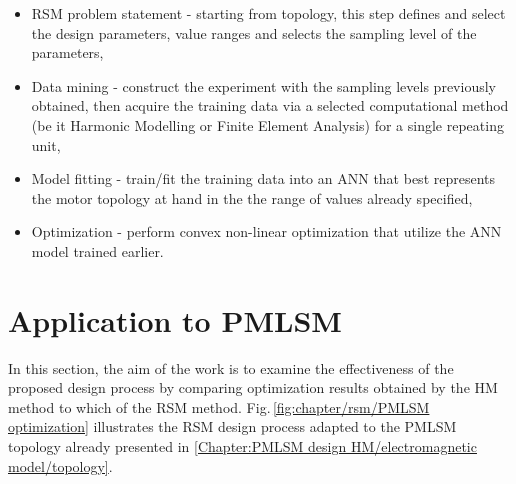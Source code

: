         
        \begin{itemize}
            \item RSM problem statement - starting from topology, this step defines and select the design parameters, value ranges and selects the sampling level of the parameters,
            \item Data mining - construct the experiment with the sampling levels previously obtained, then acquire the training data via a selected computational method (be it Harmonic Modelling or Finite Element Analysis) for a single repeating unit,
            \item Model fitting - train/fit the training data into an \ac{ANN} that best represents the motor topology at hand in the the range of values already specified,
            \item Optimization - perform convex non-linear optimization that utilize the \ac{ANN} model trained earlier.
        \end{itemize}
        

    \section{Application to \ac{PMLSM}}             \label{Chapter:RSM/PMLSM}
    
        
        In this section, the aim of the work is to examine the effectiveness of the proposed design process by comparing optimization results obtained by the \acs{HM} method to which of the \acs{RSM} method. Fig.\,\ref{fig:chapter/rsm/PMLSM optimization} illustrates the \acs{RSM} design process adapted to the \acs{PMLSM} topology already presented in \ref{Chapter:PMLSM design HM/electromagnetic model/topology}. 
        
